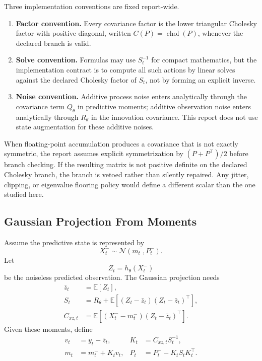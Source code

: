 \documentclass[11pt]{article}
\numberwithin{equation}{section}
\newcommand{\E}{\mathbb E}
\newcommand{\N}{\mathcal N}
\newcommand{\chol}{\operatorname{chol}}
\begin{document}
Three implementation conventions are fixed report-wide.
\begin{enumerate}[leftmargin=0.28in]
  \item \textbf{Factor convention.}  Every covariance factor is the lower
  triangular Cholesky factor with positive diagonal, written
  \(C(P)=\chol(P)\), whenever the declared branch is valid.
  \item \textbf{Solve convention.}  Formulas may use \(S_t^{-1}\) for compact
  mathematics, but the implementation contract is to compute all such actions by
  linear solves against the declared Cholesky factor of \(S_t\), not by forming
  an explicit inverse.
  \item \textbf{Noise convention.}  Additive process noise enters analytically
  through the covariance term \(Q_\theta\) in predictive moments; additive
  observation noise enters analytically through \(R_\theta\) in the innovation
  covariance.  This report does not use state augmentation for these additive
  noises.
\end{enumerate}

When floating-point accumulation produces a covariance that is not exactly
symmetric, the report assumes explicit symmetrization by
\((P+P^\top)/2\) before branch checking.  If the resulting matrix is not
positive definite on the declared Cholesky branch, the branch is vetoed rather
than silently repaired.  Any jitter, clipping, or eigenvalue flooring policy
would define a different scalar than the one studied here.

\subsection{Gaussian Projection From Moments}
\label{sec:p31-gaussian-projection}

Assume the predictive state is represented by
\begin{equation}
  X_t^-\sim\N(m_t^-,P_t^-).
  \label{eq:p31-predictive-gaussian}
\end{equation}
Let
\begin{equation}
  Z_t=h_\theta(X_t^-)
  \label{eq:p31-predicted-observation}
\end{equation}
be the noiseless predicted observation.  The Gaussian projection needs
\begin{align}
  \bar z_t &= \E[Z_t],
  \label{eq:p31-zbar}\\
  S_t &= R_\theta+\E[(Z_t-\bar z_t)(Z_t-\bar z_t)^\top],
  \label{eq:p31-S}\\
  C_{xz,t}&=\E[(X_t^- -m_t^-)(Z_t-\bar z_t)^\top].
  \label{eq:p31-Cxz}
\end{align}
Given these moments, define
\begin{align}
  v_t&=y_t-\bar z_t,
  &
  K_t&=C_{xz,t}S_t^{-1},
  \label{eq:p31-v-K}\\
  m_t&=m_t^-+K_tv_t,
  &
  P_t&=P_t^- - K_tS_tK_t^\top.
  \label{eq:p31-projection-update}
\end{align}
\end{document}
